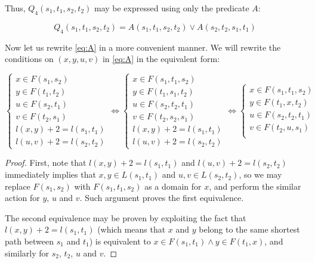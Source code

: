 Thus, $Q_4(s_1, t_1, s_2, t_2)$ may be expressed using only the predicate $A$:

\begin{equation} \label{eq:Q4A}
Q_4(s_1, t_1, s_2, t_2) = A(s_1, t_1, s_2, t_2) \vee A(s_2, t_2, s_1, t_1)
\end{equation}

Now let us rewrite \eqref{eq:A} in a more convenient manner. We will rewrite the conditions on $(x, y, u, v)$ in \eqref{eq:A} in the equivalent form:

\begin{proposition}

\begin{equation}
\begin{cases}
    x \in F(s_1, s_2)\\ 
    y \in F(t_1, t_2)\\ 
    u \in F(s_2, t_1)\\ 
    v \in F(t_2, s_1)\\ 
    l(x, y) + 2 = l(s_1, t_1)\\ 
    l(u, v) + 2 = l(s_2, t_2)
\end{cases} \Longleftrightarrow
\begin{cases}
    x \in F(s_1, t_1, s_2)\\ 
    y \in F(t_1, s_1, t_2)\\ 
    u \in F(s_2, t_2, t_1)\\ 
    v \in F(t_2, s_2, s_1)\\ 
    l(x, y) + 2 = l(s_1, t_1)\\ 
    l(u, v) + 2 = l(s_2, t_2)
\end{cases} \Longleftrightarrow
\begin{cases}
    x \in F(s_1, t_1, s_2)\\ 
    y \in F(t_1, x, t_2)\\ 
    u \in F(s_2, t_2, t_1)\\ 
    v \in F(t_2, u, s_1)\\ 
\end{cases}
\end{equation}
\end{proposition}
\begin{proof}

First, note that $l(x, y) + 2 = l(s_1, t_1)$ and $l(u, v) + 2 = l(s_2, t_2)$ immediately implies that $x, y \in L(s_1, t_1)$ and $u, v \in L(s_2, t_2)$, so we may replace $F(s_1, s_2)$ with $F(s_1, t_1, s_2)$ as a domain for $x$, and perform the similar action for $y$, $u$ and $v$. Such argument proves the first equivalence.

The second equivalence may be proven by exploiting the fact that $l(x, y) + 2 = l(s_1, t_1)$ (which means that $x$ and $y$ belong to the same shortest path between $s_1$ and $t_1$) is equivalent to $x \in F(s_1, t_1) \wedge y \in F(t_1, x)$, and similarly for $s_2$, $t_2$, $u$ and $v$. 
\end{proof}

